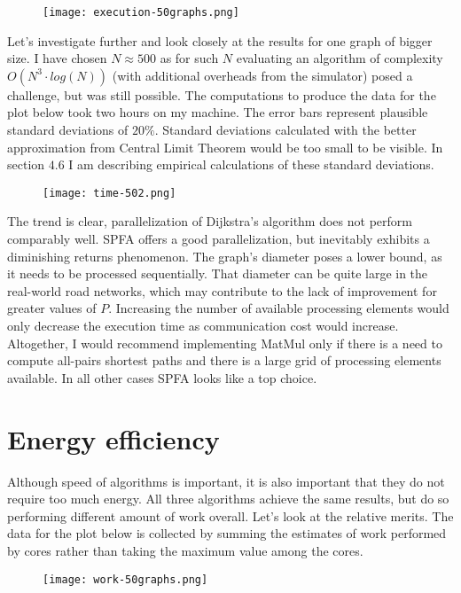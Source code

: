 \documentclass[12pt,a4paper,twoside,openright]{report}
\begin{document}
\begin{figure}[h]
\texttt{[image: execution-50graphs.png]}
\end{figure}

Let's investigate further and look closely at the results for one graph of bigger size. I have chosen $N\approx 500$ as for such $N$ evaluating an algorithm of complexity $O(N^3\cdot log(N))$ (with additional overheads from the simulator) posed a challenge, but was still possible. The computations to produce the data for the plot below took two hours on my machine. The error bars represent plausible standard deviations of $20\%$. Standard deviations calculated with the better approximation from Central Limit Theorem would be too small to be visible. In section $4.6$ I am describing empirical calculations of these standard deviations.


\begin{figure}[h]
\centering
\texttt{[image: time-502.png]}
\end{figure}


The trend is clear, parallelization of Dijkstra's algorithm does not perform comparably well. SPFA offers a good parallelization, but inevitably exhibits a diminishing returns phenomenon. The graph's diameter poses a lower bound, as it needs to be processed sequentially. That diameter can be quite large in the real-world road networks, which may contribute to the lack of improvement for greater values of $P$. Increasing the number of available processing elements would only decrease the execution time as communication cost would increase. Altogether, I would recommend implementing MatMul only if there is a need to compute all-pairs shortest paths and there is a large grid of processing elements available. In all other cases SPFA looks like a top choice.

\section{Energy efficiency}
Although speed of algorithms is important, it is also important that they do not require too much energy. All three algorithms achieve the same results, but do so performing different amount of work overall. Let's look at the relative merits. The data for the plot below is collected by summing the estimates of work performed by cores rather than taking the maximum value among the cores. 

\begin{figure}[h]
\texttt{[image: work-50graphs.png]}
\end{figure}
\end{document}
